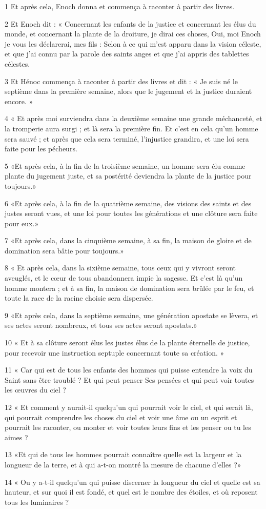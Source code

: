 \par 1 Et après cela, Enoch donna et commença à raconter à partir des livres.
\par 2 Et Enoch dit : « Concernant les enfants de la justice et concernant les élus du monde, et concernant la plante de la droiture, je dirai ces choses, Oui, moi Enoch je vous les déclarerai, mes fils : Selon à ce qui m'est apparu dans la vision céleste, et que j'ai connu par la parole des saints anges et que j'ai appris des tablettes célestes.
\par 3 Et Hénoc commença à raconter à partir des livres et dit : « Je suis né le septième dans la première semaine, alors que le jugement et la justice duraient encore. »
\par 4 « Et après moi surviendra dans la deuxième semaine une grande méchanceté, et la tromperie aura surgi ; et là sera la première fin. Et c'est en cela qu'un homme sera sauvé ; et après que cela sera terminé, l'injustice grandira, et une loi sera faite pour les pécheurs.
\par 5 «Et après cela, à la fin de la troisième semaine, un homme sera élu comme plante du jugement juste, et sa postérité deviendra la plante de la justice pour toujours.»
\par 6 «Et après cela, à la fin de la quatrième semaine, des visions des saints et des justes seront vues, et une loi pour toutes les générations et une clôture sera faite pour eux.»
\par 7 «Et après cela, dans la cinquième semaine, à sa fin, la maison de gloire et de domination sera bâtie pour toujours.»
\par 8 « Et après cela, dans la sixième semaine, tous ceux qui y vivront seront aveuglés, et le cœur de tous abandonnera impie la sagesse. Et c'est là qu'un homme montera ; et à sa fin, la maison de domination sera brûlée par le feu, et toute la race de la racine choisie sera dispersée.
\par 9 «Et après cela, dans la septième semaine, une génération apostate se lèvera, et ses actes seront nombreux, et tous ses actes seront apostats.»
\par 10 « Et à sa clôture seront élus les justes élus de la plante éternelle de justice, pour recevoir une instruction septuple concernant toute sa création. »
\par 11 « Car qui est de tous les enfants des hommes qui puisse entendre la voix du Saint sans être troublé ? Et qui peut penser Ses pensées et qui peut voir toutes les œuvres du ciel ?
\par 12 « Et comment y aurait-il quelqu'un qui pourrait voir le ciel, et qui serait là, qui pourrait comprendre les choses du ciel et voir une âme ou un esprit et pourrait les raconter, ou monter et voir toutes leurs fins et les penser ou tu les aimes ?
\par 13 «Et qui de tous les hommes pourrait connaître quelle est la largeur et la longueur de la terre, et à qui a-t-on montré la mesure de chacune d'elles ?»
\par 14 « Ou y a-t-il quelqu'un qui puisse discerner la longueur du ciel et quelle est sa hauteur, et sur quoi il est fondé, et quel est le nombre des étoiles, et où reposent tous les luminaires ?



